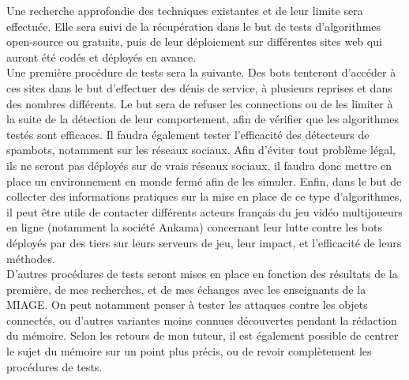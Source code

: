 \documentclass[12pt,a4paper,oldfontcommands]{memoir}
\begin{document}
Une recherche approfondie des techniques existantes et de leur limite sera effectuée. Elle sera suivi de la récupération dans le but de tests d'algorithmes open-source ou gratuits, puis de leur déploiement sur différentes sites web qui auront été codés et déployés en avance. \\

Une première procédure de tests sera la suivante. Des bots tenteront d'accéder à ces sites dans le but d'effectuer des dénis de service, à plusieurs reprises et dans des nombres différents. Le but sera de refuser les connections ou de les limiter à la suite de la détection de leur comportement, afin de vérifier que les algorithmes testés sont efficaces. Il faudra également tester l'efficacité des détecteurs de spambots, notamment sur les réseaux sociaux. Afin d'éviter tout problème légal, ils ne seront pas déployés sur de vrais réseaux sociaux, il faudra donc mettre en place un environnement en monde fermé afin de les simuler. Enfin, dans le but de collecter des informations pratiques sur la mise en place de ce type d'algorithmes, il peut être utile de contacter différents acteurs français du jeu vidéo multijoueurs en ligne (notamment la société Ankama) concernant leur lutte contre les bots déployés par des tiers sur leurs serveurs de jeu, leur impact, et l'efficacité de leurs méthodes.\\

D'autres procédures de tests seront mises en place en fonction des résultats de la première, de mes recherches, et de mes échanges avec les enseignants de la MIAGE. On peut notamment penser à tester les attaques contre les objets connectés, ou d'autres variantes moins connues découvertes pendant la rédaction du mémoire. Selon les retours de mon tuteur, il est également possible de centrer le sujet du mémoire sur un point plus précis, ou de revoir complètement les procédures de tests.
\end{document}
